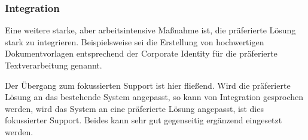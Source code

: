 \subsubsection{Integration}
Eine weitere starke, aber arbeitsintensive Maßnahme ist, die präferierte Lösung stark zu integrieren. Beispielsweise sei die Erstellung von hochwertigen Dokumentvorlagen entsprechend der Corporate Identity für die präferierte Textverarbeitung genannt.

Der Übergang zum fokussierten Support ist hier fließend. Wird die präferierte Lösung an das bestehende System angepasst, so kann von Integration gesprochen werden, wird das System an eine präferierte Lösung angepasst, ist dies fokussierter Support. Beides kann sehr gut gegenseitig ergänzend eingesetzt werden.
